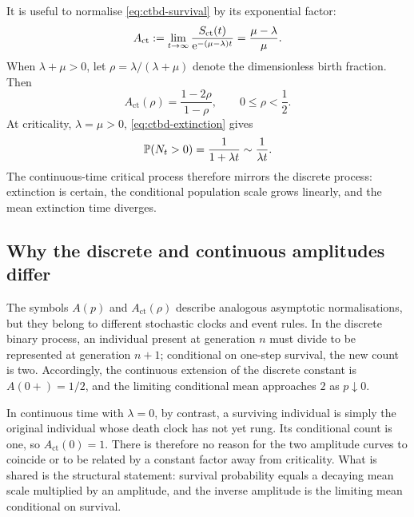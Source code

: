 It is useful to normalise \cref{eq:ctbd-survival} by its exponential factor:
\begin{equation}
  A_{\mathrm{ct}}
  :=\lim_{t\to\infty}\frac{S_{\mathrm{ct}}(t)}
                                 {\mathrm{e}^{-(\mu-\lambda)t}}
  =\frac{\mu-\lambda}{\mu}.
  \label{eq:ctbd-amplitude}
\end{equation}
When $\lambda+\mu>0$, let $\rho=\lambda/(\lambda+\mu)$ denote the dimensionless birth fraction.  Then
\begin{equation}
  A_{\mathrm{ct}}(\rho)=\frac{1-2\rho}{1-\rho},
  \qquad 0\le \rho<\frac12.
  \label{eq:ctbd-amplitude-p}
\end{equation}
At criticality, $\lambda=\mu>0$, \cref{eq:ctbd-extinction} gives
\[
  \mathbb{P}(N_t>0)=\frac{1}{1+\lambda t}
  \sim\frac{1}{\lambda t}.
\]
The continuous-time critical process therefore mirrors the discrete process: extinction is certain, the conditional population scale grows linearly, and the mean extinction time diverges.

\subsection{Why the discrete and continuous amplitudes differ}
\label{sec:amplitude-comparison}

The symbols $A(p)$ and $A_{\mathrm{ct}}(\rho)$ describe analogous asymptotic normalisations, but they belong to different stochastic clocks and event rules.  In the discrete binary process, an individual present at generation $n$ must divide to be represented at generation $n+1$; conditional on one-step survival, the new count is two.  Accordingly, the continuous extension of the discrete constant is $A(0+)=1/2$, and the limiting conditional mean approaches $2$ as $p\downarrow0$.

In continuous time with $\lambda=0$, by contrast, a surviving individual is simply the original individual whose death clock has not yet rung.  Its conditional count is one, so $A_{\mathrm{ct}}(0)=1$.  There is therefore no reason for the two amplitude curves to coincide or to be related by a constant factor away from criticality.  What is shared is the structural statement: survival probability equals a decaying mean scale multiplied by an amplitude, and the inverse amplitude is the limiting mean conditional on survival.
